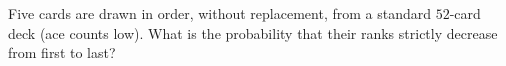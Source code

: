 Five cards are drawn in order, without replacement, from a standard $52$-card deck (ace counts low). What is the probability that their ranks strictly decrease from first to last?
